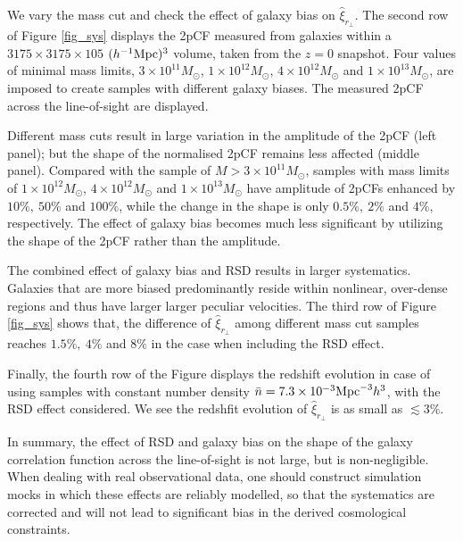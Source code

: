 \documentclass[iop]{emulateapj}
\begin{document}
We vary the mass cut and check the effect of galaxy bias on $\hat \xi_{r_\perp}$.
The second row of Figure \ref{fig_sys} displays the 2pCF measured from galaxies within a $3175\times3175\times105$ $(h^{-1}\rm Mpc)^3$ volume, taken from the $z=0$ snapshot.
Four values of minimal mass limits, $3\times 10^{11} M_{\odot}$, $1\times 10^{12} M_{\odot}$, $4\times 10^{12} M_{\odot}$ and $1\times 10^{13} M_{\odot}$,
are imposed to create samples with different galaxy biases.
The measured 2pCF across the line-of-sight are displayed.

Different mass cuts result in large variation in the amplitude of the 2pCF (left panel);
but the shape of the normalised 2pCF remains less affected (middle panel).
Compared with the sample of $M>3\times 10^{11} M_{\odot}$,
samples with mass limits of $1\times 10^{12} M_{\odot}$, $4\times 10^{12} M_{\odot}$ and $1\times 10^{13} M_{\odot}$
have amplitude of 2pCFs enhanced by $10\%,\ 50\%$ and $100\%$, 
while the change in the shape is only $0.5\%,\ 2\%$ and $4\%$, respectively.
The effect of galaxy bias becomes much less significant by utilizing the shape of the 2pCF rather than the amplitude.

The combined effect of galaxy bias and RSD results in larger systematics.
Galaxies that are more biased predominantly reside within nonlinear, over-dense regions and thus have larger larger peculiar velocities.
The third row of Figure \ref{fig_sys} shows that, 
the difference of $\hat \xi_{r_\perp}$ among different mass cut samples reaches $1.5\%,\ 4\%$ and $8\%$ in the case when including the RSD effect.

Finally, the fourth row of the Figure displays the 
redshift evolution in case of using samples with constant number density $\bar n=7.3\times 10^{-3} {\rm Mpc}^{-3}h^3$, 
with the RSD effect considered. %
We see the redshfit evolution of $\hat \xi_{r_\perp}$ is as small as $\lesssim3\%$.

In summary, the effect of RSD and galaxy bias on the shape of the galaxy correlation function across the line-of-sight is not large, but is non-negligible.
When dealing with real observational data, one should construct simulation mocks in which these effects are reliably modelled, 
so that the systematics are corrected and will not lead to significant bias in the derived cosmological constraints.

\end{document}
